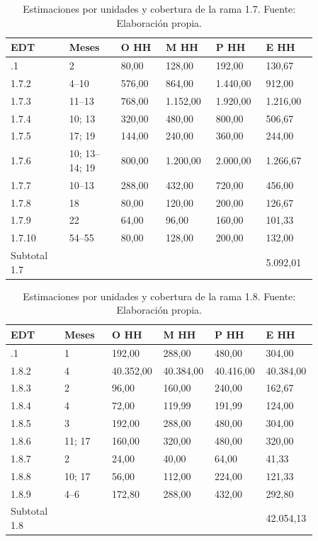 \documentclass[11pt]{article}
\begin{document}
\begingroup
\small
\begin{longtable}{@{}p{0.17\linewidth}p{0.15\linewidth}p{0.13\linewidth}p{0.13\linewidth}p{0.13\linewidth}p{0.15\linewidth}@{}}
\caption[Estimaciones por unidades y cobertura de la rama 1.7]{Estimaciones por unidades y cobertura de la rama 1.7. Fuente: Elaboración propia.}\label{tab:t15-tareas-7}\\
\toprule
\textbf{EDT} & \textbf{Meses} & \textbf{O HH} & \textbf{M HH} & \textbf{P HH} & \textbf{E HH} \\
\midrule
\endhead
\bottomrule
\endlastfoot
1.7.1 & 2 & 80,00 & 128,00 & 192,00 & 130,67 \\
1.7.2 & 4--10 & 576,00 & 864,00 & 1.440,00 & 912,00 \\
1.7.3 & 11--13 & 768,00 & 1.152,00 & 1.920,00 & 1.216,00 \\
1.7.4 & 10; 13 & 320,00 & 480,00 & 800,00 & 506,67 \\
1.7.5 & 17; 19 & 144,00 & 240,00 & 360,00 & 244,00 \\
1.7.6 & 10; 13--14; 19 & 800,00 & 1.200,00 & 2.000,00 & 1.266,67 \\
1.7.7 & 10--13 & 288,00 & 432,00 & 720,00 & 456,00 \\
1.7.8 & 18 & 80,00 & 120,00 & 200,00 & 126,67 \\
1.7.9 & 22 & 64,00 & 96,00 & 160,00 & 101,33 \\
1.7.10 & 54--55 & 80,00 & 128,00 & 200,00 & 132,00 \\
Subtotal 1.7 &  &  &  &  & 5.092,01 \\
\end{longtable}
\endgroup



\begingroup
\small
\begin{longtable}{@{}p{0.17\linewidth}p{0.15\linewidth}p{0.13\linewidth}p{0.13\linewidth}p{0.13\linewidth}p{0.15\linewidth}@{}}
\caption[Estimaciones por unidades y cobertura de la rama 1.8]{Estimaciones por unidades y cobertura de la rama 1.8. Fuente: Elaboración propia.}\label{tab:t15-tareas-8}\\
\toprule
\textbf{EDT} & \textbf{Meses} & \textbf{O HH} & \textbf{M HH} & \textbf{P HH} & \textbf{E HH} \\
\midrule
\endhead
\bottomrule
\endlastfoot
1.8.1 & 1 & 192,00 & 288,00 & 480,00 & 304,00 \\
1.8.2 & 4 & 40.352,00 & 40.384,00 & 40.416,00 & 40.384,00 \\
1.8.3 & 2 & 96,00 & 160,00 & 240,00 & 162,67 \\
1.8.4 & 4 & 72,00 & 119,99 & 191,99 & 124,00 \\
1.8.5 & 3 & 192,00 & 288,00 & 480,00 & 304,00 \\
1.8.6 & 11; 17 & 160,00 & 320,00 & 480,00 & 320,00 \\
1.8.7 & 2 & 24,00 & 40,00 & 64,00 & 41,33 \\
1.8.8 & 10; 17 & 56,00 & 112,00 & 224,00 & 121,33 \\
1.8.9 & 4--6 & 172,80 & 288,00 & 432,00 & 292,80 \\
Subtotal 1.8 &  &  &  &  & 42.054,13 \\
\end{longtable}
\endgroup
\end{document}
